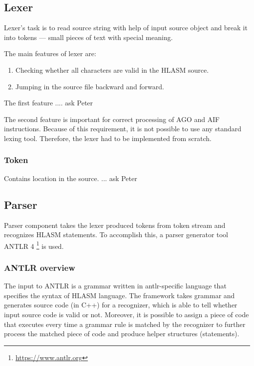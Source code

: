 \subsection{Lexer}

Lexer's task is to read source string with help of input source object and break it into tokens --- small pieces of text with special meaning. 

The main features of lexer are:
\begin{enumerate}
	\item Checking whether all characters are valid in the HLASM source.
	\item Jumping in the source file backward and forward.
\end{enumerate}

The first feature .... ask Peter

The second feature is important for correct processing of AGO and AIF instructions. Because of this requirement, it is not possible to use any standard lexing tool. Therefore, the lexer had to be implemented from scratch.

\subsubsection{Token}

Contains location in the source. ... ask Peter


\subsection{Parser}

Parser component takes the lexer produced tokens from token stream and recognizes HLASM statements. To accomplish this, a parser generator tool ANTLR 4 \footnote{\url{https://www.antlr.org}} is used.

\subsubsection{ANTLR overview}

The input to ANTLR is a grammar written in antlr-specific language that specifies the syntax of HLASM language. The framework takes grammar and generates source code (in C++) for a recognizer, which is able to tell whether input source code is valid or not. Moreover, it is possible to assign a piece of code that executes every time a grammar rule is matched by the recognizer to further process the matched piece of code and produce helper structures (statements).

